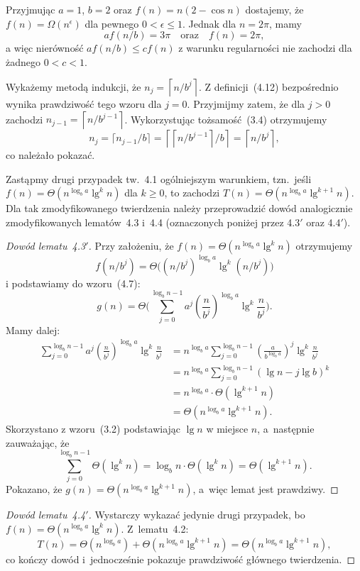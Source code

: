\exercise %
Przyjmując $a=1$, $b=2$ oraz $f(n)=n(2-\cos n)$ dostajemy, że $f(n)=\Omega(n^\epsilon)$ dla pewnego $0<\epsilon\le1$. Jednak dla $n=2\pi$, mamy
\[
	af(n/b) = 3\pi \quad\text{oraz}\quad f(n) = 2\pi,
\]
a więc nierówność $af(n/b)\le cf(n)$ z warunku regularności nie zachodzi dla żadnego $0<c<1$.


\exercise %
Wykażemy metodą indukcji, że $n_j=\left\lceil n/b^j\right\rceil$. Z definicji~(4.12) bezpośrednio wynika prawdziwość tego wzoru dla $j=0$. Przyjmijmy zatem, że dla $j>0$ zachodzi $n_{j-1}=\left\lceil n/b^{j-1}\right\rceil$. Wykorzystując tożsamość~(3.4) otrzymujemy
\[
	n_j = \lceil n_{j-1}/b\rceil = \left\lceil\left\lceil n/b^{j-1}\right\rceil\!/b\right\rceil = \left\lceil n/b^j\right\rceil,
\]
co należało pokazać.

\exercise %
Zastąpmy drugi przypadek tw.~4.1 ogólniejszym warunkiem, tzn.\ jeśli $f(n)=\Theta(n^{\log_ba}\lg^kn)$ dla $k\ge0$, to zachodzi $T(n)=\Theta(n^{\log_ba}\lg^{k+1}n)$. Dla tak zmodyfikowanego twierdzenia należy przeprowadzić dowód analogicznie zmodyfikowanych lematów~4.3 i~4.4 (oznaczonych poniżej przez 4.3$'$ oraz 4.4$'$).

\begin{proof}[Dowód lematu~4.3\/$'$]
	Przy założeniu, że $f(n)=\Theta(n^{\log_ba}\lg^kn)$ otrzymujemy
	\[
		f(n/b^j)=\Theta\bigl((n/b^j)^{\log_ba}\lg^k(n/b^j)\bigr)
	\]
	i podstawiamy do wzoru~(4.7):
	\[
		g(n) = \Theta\biggl(\sum_{j=0}^{\log_bn-1}a^j\left(\frac{n}{b^j}\right)^{\log_ba}\lg^k\frac{n}{b^j}\biggr).
	\]
	Mamy dalej:
	\begin{align*}
		\sum_{j=0}^{\log_bn-1}a^j\left(\frac{n}{b^j}\right)^{\log_ba}\lg^k\frac{n}{b^j} &= n^{\log_ba}\sum_{j=0}^{\log_bn-1}\left(\frac{a}{b^{\log_ba}}\right)^j\lg^k\frac{n}{b^j} \\
		&= n^{\log_ba}\sum_{j=0}^{\log_bn-1}(\lg n-j\lg b)^k \\
		&= n^{\log_ba}\cdot\Theta(\lg^{k+1}n) \\
		&= \Theta(n^{\log_ba}\lg^{k+1}n).
	\end{align*}
	Skorzystano z wzoru~(3.2) podstawiając $\lg n$ w miejsce $n$, a~następnie zauważając, że
	\[
		\sum_{j=0}^{\log_bn-1}\Theta(\lg^kn) = \log_bn\cdot\Theta(\lg^kn) = \Theta(\lg^{k+1}n).
	\]
	Pokazano, że $g(n)=\Theta(n^{\log_ba}\lg^{k+1}n)$, a~więc lemat jest prawdziwy.
\end{proof}

\begin{proof}[Dowód lematu~4.4\/$'$]
	Wystarczy wykazać jedynie drugi przypadek, bo $f(n)=\Theta(n^{\log_ba}\lg^kn)$. Z~lematu~4.2:
	\[
		T(n) = \Theta(n^{\log_ba})+\Theta(n^{\log_ba}\lg^{k+1}n) = \Theta(n^{\log_ba}\lg^{k+1}n),
	\]
	co kończy dowód i~jednocześnie pokazuje prawdziwość głównego twierdzenia.
\end{proof}

